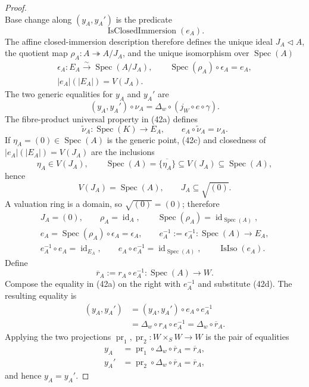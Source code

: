 \begin{proof}
\[  \]
  Base change along $(y_A,y_A')$ is the predicate
  \[
    \operatorname{IsClosedImmersion}(e_A).
  \]
  The affine closed-immersion description therefore defines the unique ideal
  $J_A\triangleleft A$, the quotient map
  $\rho_A\colon A\twoheadrightarrow A/J_A$, and the unique isomorphism over
  $\operatorname{Spec}(A)$
  \[
  \begin{gathered}
    \epsilon_A\colon E_A\xrightarrow{\sim}\operatorname{Spec}(A/J_A),
    \qquad
    \operatorname{Spec}(\rho_A)\circ\epsilon_A=e_A,\\
    |e_A|(|E_A|)=V(J_A).                                        
  \end{gathered} \tag{42b}
  \]
  The two generic equalities for $y_A$ and $y_A'$ are
  \[
    (y_A,y_A')\circ\nu_A
      =\Delta_w\circ(j_W\circ e\circ\gamma).
  \]
  The fibre-product universal property in (42a) defines
  \[
    \widetilde\nu_A\colon\operatorname{Spec}(K)\to E_A,
    \qquad e_A\circ\widetilde\nu_A=\nu_A.                       \tag{42c}
  \]
  If $\eta_A=(0)\in\operatorname{Spec}(A)$ is the generic point, (42c) and
  closedness of $|e_A|(|E_A|)=V(J_A)$ are the inclusions
  \[
    \eta_A\in V(J_A),
    \qquad
    \operatorname{Spec}(A)=\overline{\{\eta_A\}}
      \subseteq V(J_A)\subseteq\operatorname{Spec}(A),
  \]
  hence
  \[
    V(J_A)=\operatorname{Spec}(A),
    \qquad J_A\subseteq\sqrt{(0)}.
  \]
  A valuation ring is a domain, so $\sqrt{(0)}=(0)$; therefore
  \[
  \begin{gathered}
    J_A=(0),\qquad
    \rho_A=\operatorname{id}_A,\qquad
    \operatorname{Spec}(\rho_A)=
      \operatorname{id}_{\operatorname{Spec}(A)},\\
    e_A=\operatorname{Spec}(\rho_A)\circ\epsilon_A=\epsilon_A,
    \qquad
    e_A^{-1}:=\epsilon_A^{-1}\colon\operatorname{Spec}(A)\to E_A,\\
    e_A^{-1}\circ e_A=\operatorname{id}_{E_A},\qquad
    e_A\circ e_A^{-1}=\operatorname{id}_{\operatorname{Spec}(A)},\qquad
    \operatorname{IsIso}(e_A).                                  
  \end{gathered} \tag{42d}
  \]
  Define
  \[
    \overline r_A:=r_A\circ e_A^{-1}
      \colon\operatorname{Spec}(A)\longrightarrow W.
  \]
  Compose the equality in (42a) on the right with $e_A^{-1}$ and substitute
  (42d).  The resulting equality is
  \[
  \begin{aligned}
    (y_A,y_A')
      &=(y_A,y_A')\circ e_A\circ e_A^{-1}\\
      &=\Delta_w\circ r_A\circ e_A^{-1}
       =\Delta_w\circ\overline r_A.
  \end{aligned}
  \]
  Applying the two projections
  $\operatorname{pr}_1,\operatorname{pr}_2\colon W\times_SW\to W$ is the
  pair of equalities
  \[
  \begin{aligned}
    y_A&=\operatorname{pr}_1\circ\Delta_w\circ\overline r_A
      =\overline r_A,\\
    y_A'&=\operatorname{pr}_2\circ\Delta_w\circ\overline r_A
      =\overline r_A,
  \end{aligned}
  \]
  and hence $y_A=y_A'$.
\end{proof}

